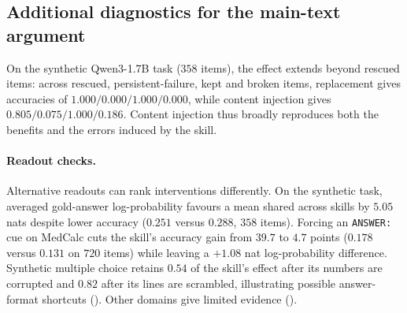\begin{table}[tbp]
\caption{The decomposition of Eq.~\ref{eq:decomp}, synthetic control,
Qwen3-1.7B, fp32, $n=358$, at the last prompt position. $\mathrm{PR}$ is the
participation ratio of $\{\dvec_i\}$ after removing their shared mean direction:
the effective number of dimensions the item-to-item variation occupies, out of
2048. The last column is the fraction of a single item's $\dvec_i$ that lies
along that shared direction.}
\label{tab:geometry-tierA}
\centering
\small

\end{table}
\begin{table}[tbp]
\caption{Fraction of the rescued cell answered correctly under each injected
component. Synthetic control, multiple choice, Qwen3-1.7B, fp32, $n=358$,
rescued cell $n_R=82$. Bootstrap 95\% CIs over items are $\pm0.09$ to $\pm0.11$
at these magnitudes and are given in the appendix. $\bar{\dvec}$ is the mean
content direction over items, restored to the typical per-item norm; $\dvec_j$
is another item's content vector, drawn from the same or a different conversion
family. The row that licenses the name ``content component'' is $\gvec$.}
\label{tab:causal}
\centering
\small

\end{table}

\subsection{Additional diagnostics for the main-text argument}
\label{app:narrative-diagnostics}

On the synthetic Qwen3-1.7B task ($358$ items), the effect extends beyond
rescued items: across rescued, persistent-failure, kept and broken items, replacement gives
accuracies of $1.000/\allowbreak0.000/\allowbreak1.000/\allowbreak0.000$, while content injection gives
$0.805/\allowbreak0.075/\allowbreak1.000/\allowbreak0.186$. Content injection thus broadly reproduces both the
benefits and the errors induced by the skill.

\paragraph{Readout checks.}

Alternative readouts can rank interventions differently. On the synthetic task,
averaged gold-answer log-probability favours a mean shared across skills by
$5.05$ nats despite lower accuracy ($0.251$ versus $0.288$, $358$ items).
Forcing an \texttt{ANSWER:} cue on MedCalc cuts the skill's accuracy gain from
$39.7$ to $4.7$ points ($0.178$ versus $0.131$ on $720$ items) while leaving a
$+1.08$ nat log-probability difference. Synthetic multiple
choice retains $0.54$ of the skill's effect after its numbers are corrupted and
$0.82$ after its lines are scrambled, illustrating possible answer-format
shortcuts
\citep{balepur2024artifacts} (). Other domains give limited evidence
().


